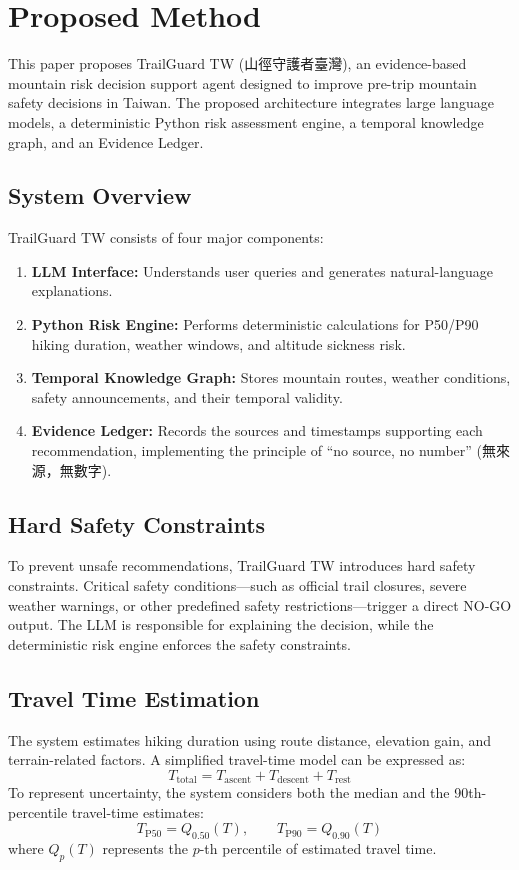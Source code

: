 \documentclass[conference]{IEEEtran}
\begin{document}
\section{Proposed Method}
This paper proposes TrailGuard TW (山徑守護者臺灣), an evidence-based mountain risk decision support agent designed to improve pre-trip mountain safety decisions in Taiwan. The proposed architecture integrates large language models, a deterministic Python risk assessment engine, a temporal knowledge graph, and an Evidence Ledger.

\subsection{System Overview}
TrailGuard TW consists of four major components:
\begin{enumerate}
    \item \textbf{LLM Interface:} Understands user queries and generates natural-language explanations.
    \item \textbf{Python Risk Engine:} Performs deterministic calculations for P50/P90 hiking duration, weather windows, and altitude sickness risk.
    \item \textbf{Temporal Knowledge Graph:} Stores mountain routes, weather conditions, safety announcements, and their temporal validity.
    \item \textbf{Evidence Ledger:} Records the sources and timestamps supporting each recommendation, implementing the principle of ``no source, no number'' (無來源，無數字).
\end{enumerate}

\subsection{Hard Safety Constraints}
To prevent unsafe recommendations, TrailGuard TW introduces hard safety constraints. Critical safety conditions—such as official trail closures, severe weather warnings, or other predefined safety restrictions—trigger a direct NO-GO output. The LLM is responsible for explaining the decision, while the deterministic risk engine enforces the safety constraints.

\subsection{Travel Time Estimation}
The system estimates hiking duration using route distance, elevation gain, and terrain-related factors. A simplified travel-time model can be expressed as:
\begin{equation}
T_{\mathrm{total}} = T_{\mathrm{ascent}} + T_{\mathrm{descent}} + T_{\mathrm{rest}}
\label{eq:travel}
\end{equation}
To represent uncertainty, the system considers both the median and the 90th-percentile travel-time estimates:
\begin{equation}
T_{\mathrm{P50}} = Q_{0.50}(T), \qquad T_{\mathrm{P90}} = Q_{0.90}(T)
\end{equation}
where $Q_p(T)$ represents the $p$-th percentile of estimated travel time.
\end{document}

